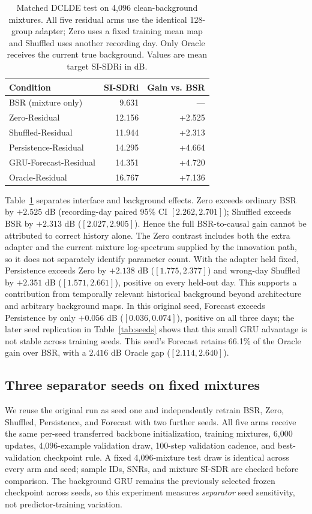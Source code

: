 \documentclass[conference]{IEEEtran}
\begin{document}
\begin{table}[t]
\caption{Matched DCLDE test on 4,096 clean-background mixtures. All five
residual arms use the identical 128-group adapter; Zero uses a fixed training
mean map and Shuffled uses another recording day. Only Oracle receives the
current true background. Values are mean target SI-SDRi in dB.}
\label{tab:causalresidual}\centering\footnotesize
\begin{tabular}{lrr}
\toprule
Condition & SI-SDRi & Gain vs. BSR\\
\midrule
BSR (mixture only)&9.631&---\\
Zero-Residual&12.156&+2.525\\
Shuffled-Residual&11.944&+2.313\\
Persistence-Residual&14.295&+4.664\\
GRU-Forecast-Residual&14.351&+4.720\\
Oracle-Residual&16.767&+7.136\\
\bottomrule
\end{tabular}
\end{table}

Table~\ref{tab:causalresidual} separates interface and background effects.
Zero exceeds ordinary BSR by $+2.525$ dB (recording-day paired 95\% CI
$[2.262,2.701]$); Shuffled exceeds BSR by $+2.313$ dB
($[2.027,2.905]$). Hence the full BSR-to-causal gain cannot be attributed
to correct history alone. The Zero contrast includes both the extra adapter
and the current mixture log-spectrum supplied by the innovation path, so it
does not separately identify parameter count. With the adapter held fixed,
Persistence exceeds Zero by $+2.138$ dB ($[1.775,2.377]$) and wrong-day
Shuffled by $+2.351$ dB ($[1.571,2.661]$), positive on every held-out day.
This supports a contribution from temporally relevant historical background
beyond architecture and arbitrary background maps. In this original seed,
Forecast exceeds Persistence by only $+0.056$ dB ($[0.036,0.074]$), positive
on all three days; the later seed replication in Table~\ref{tab:seeds}
shows that this small GRU advantage is not stable across training seeds.
This seed's Forecast retains 66.1\% of the Oracle gain over BSR, with a
$2.416$ dB Oracle gap ($[2.114,2.640]$).

\subsection{Three separator seeds on fixed mixtures}
We reuse the original run as seed one and independently retrain BSR, Zero,
Shuffled, Persistence, and Forecast with two further seeds. All five arms
receive the same per-seed transferred backbone initialization, training
mixtures, 6,000 updates, 4,096-example validation draw, 100-step validation
cadence, and best-validation checkpoint rule. A fixed 4,096-mixture test draw
is identical across every arm and seed; sample IDs, SNRs, and mixture SI-SDR
are checked before comparison. The background GRU remains the previously
selected frozen checkpoint across seeds, so this experiment measures
\emph{separator} seed sensitivity, not predictor-training variation.
\end{document}
